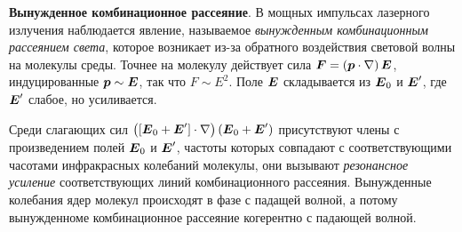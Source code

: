 \textbf{Вынужденное комбинационное рассеяние}.
В мощных импульсах лазерного излучения наблюдается явление, называемое \textit{вынужденным комбинационным рассеянием света}, которое возникает из-за обратного воздействия световой волны на молекулы среды. Точнее на молекулу действует сила $\mbox{\boldmath $F$} = \left(\mbox{\boldmath $p$} \cdot \nabla\right) \mbox{\boldmath $E$}$, индуцированные $\mbox{\boldmath $p$} \sim \mbox{\boldmath $E$}$, так что $F \sim E^2$. Поле $\mbox{\boldmath $E$}$ складывается из $\mbox{\boldmath $E$}_0$ и $\mbox{\boldmath $E$}'$, где $\mbox{\boldmath $E$}'$ слабое, но усиливается.

Среди слагающих сил $\left([\mbox{\boldmath $E$}_0 + \mbox{\boldmath $E$}']\cdot \nabla\right) (\mbox{\boldmath $E$}_0 + \mbox{\boldmath $E$}')$ присутствуют члены с произведением полей $\mbox{\boldmath $E$}_0$ и $\mbox{\boldmath $E$}'$, частоты которых совпадают с соответствующими часотами инфракрасных колебаний молекулы, они вызывают \textit{резонансное усиление} соответствующих линий комбинационного рассеяния. Вынужденные колебания ядер молекул происходят в фазе с падащей волной, а потому вынужденноме комбинационное рассеяние когерентно с падающей волной.